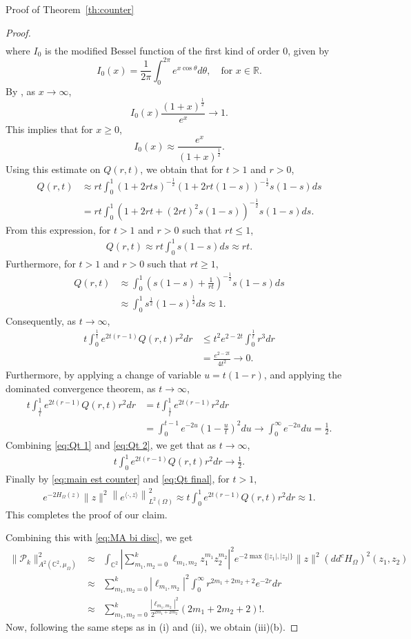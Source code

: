 \documentclass[11pt, oneside, reqno]{amsart}
\numberwithin{equation}{section}
\theoremstyle{definition}
\newcommand{\beas}{\begin{eqnarray*}}
\newcommand{\eeas}{\end{eqnarray*}}
\newcommand{\bea} {\begin{eqnarray}}
\newcommand{\eea} {\end{eqnarray}}
\newcommand{\C}{\mathbb C}
\newcommand{\R}{\mathbb{R}}
\newcommand{\ltt}{\left(}
\newcommand{\rtt}{\right)}
\newcommand{\Om}{\Omega}
\begin{document}
{\begin{section}{Proof of Theorem~\ref{th:counter}}
\begin{proof}
{\begin{align*}
\end{align*}
where $I_0$ is the modified Bessel function of the first kind of order $0$, given by
\[
I_0(x)=\frac{1}{2\pi}\int_0^{2\pi} e^{{x} \cos\theta} d\theta,\quad \text{for } x\in\R.
\]
By \cite[9.7.1]{AB48}, as $x\rightarrow\infty$,
\[
I_0(x) \frac{(1+x)^{\frac{1}{2}}}{e^x}\rightarrow 1.
\]
This implies that for $x\geq 0$, 
\[
I_0(x)\approx  \frac{e^x}{(1+x)^{\frac{1}{2}}}.
\]
Using this estimate on $Q(r,t)$, we obtain that for $t>1$ and $r>0$,
\beas
Q(r,t)&\approx rt\int_0^1 (1+2rts)^{-\frac{1}{2}}(1+2rt(1-s))^{-\frac{1}{2}}  s(1-s) ds\\
&= rt\int_0^1 (1+2rt+(2rt)^2 s(1-s))^{-\frac{1}{2}}  s(1-s) ds.
\eeas
From this expression, for $t>1$ and $r>0$ such that $rt\leq 1$,
\beas
Q(r,t)\approx rt \int_0^1 s(1-s) ds\approx rt.
\eeas
Furthermore, for $t>1$ and $r>0$ such that $rt\geq 1$,
\begin{align*}
\nonumber Q(r,t)&\approx \int_0^1  \ltt s(1-s)+\frac{1}{rt}\rtt^{-\frac{1}{2}}  s(1-s) ds\\
&\approx \int_0^1 s^{\frac{1}{2}}(1-s)^{\frac{1}{2}} ds\approx 1.
\end{align*}
Consequently, as $t\rightarrow\infty$,
 \begin{align}\label{eq:Qt 1}
\nonumber t\int_0^{\frac{1}{t}} e^{2t(r-1)}Q(r,t) r^2 dr&\leq t^2 e^{2-2t}\int_0^{\frac{1}{t}}r^3 dr\\
&= \frac{ e^{2-2t}}{4t^2}\rightarrow 0.
 \end{align}
 Furthermore, by applying a change of variable $u=t(1-r)$, and applying the dominated convergence theorem, as $t\rightarrow \infty$,
 \begin{align}\label{eq:Qt 2}
    \nonumber t \int_{\frac{1}{t}}^1 e^{2t(r-1)}Q(r,t) r^2 dr&= t \int_{\frac{1}{t}}^1 e^{2t(r-1)} r^2 dr\\
     &=\int_0^{t-1} e^{-2u} \ltt1-\frac{u}{t}\rtt^2 du \rightarrow \int_0^\infty e^{-2u} du=\frac{1}{2}.
 \end{align}
 Combining \eqref{eq:Qt 1} and \eqref{eq:Qt 2}, we get that as $t\rightarrow\infty$,
 \bea\label{eq:Qt final}
 t\int_0^1 e^{2t(r-1)}Q(r,t) r^2 dr\rightarrow \frac{1}{2}.
 \eea
 Finally by \eqref{eq:main est counter} and \eqref{eq:Qt final}, for $t>1$, 
 \beas
 e^{-2H_\Om(z)}\|z\|^2\left\|e^{\langle\cdot, z\rangle}\right\|^2_{L^2(\Om)}\approx t\int_0^1 e^{2t(r-1)}Q(r,t) r^2 dr\approx 1.
 \eeas
 This completes the proof of our claim.
 
%
Combining this with \eqref{eq:MA bi disc}, we get
\bea\nonumber
       \|\mathcal P_k\|_{A^2(\C^2,\mu_\Om)}^2&\approx&\int_{\C^2}\left|{\sum\limits_{m_1,m_2=0}^k \ell_{m_1,m_2}} z_1^{m_1}z_2^{m_2}\right|^2 e^{-2\max\{|z_1|,|z_2|\}}\|z\|^{2}(dd^cH_\Om)^2(z_1,z_2)\\
       \nonumber
       &\approx&  \sum\limits_{m_1,m_2=0}^k |\ell_{m_1,m_2}|^2\int_0^\infty r^{2m_1+2m_2+2}e^{-2r} dr\\
      \nonumber &\approx& \sum\limits_{m_1,m_2=0}^k \frac{|\ell_{m_1,m_2}|^2}{2^{2m_1+2m_2}}(2m_1+2m_2+2)!.
       \eea
 Now, following the same steps as in (i) and (ii), we obtain (iii)(b).}
\end{proof}


\end{section}}
\end{document}
